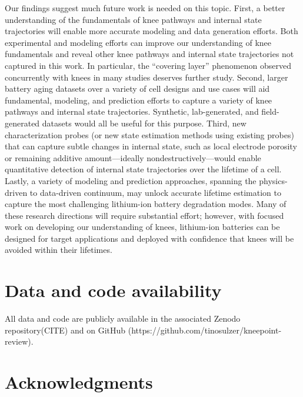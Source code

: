 \documentclass[journal=jpclcd,manuscript=article]{achemso}
\newcommand{\pbox}[1]{{
\fbox{
\parbox{0.8\textwidth}{  \fbox{$\triangleright$\textcolor{blue}{\textbf{Peter}:}} 
#1
}}}}
\begin{document}
Our findings suggest much future work is needed on this topic.
First, a better understanding of the fundamentals of knee pathways and internal state trajectories will enable more accurate modeling and data generation efforts. Both experimental and modeling efforts can improve our understanding of knee fundamentals and reveal other knee pathways and internal state trajectories not captured in this work.
In particular, the ``covering layer'' phenomenon observed concurrently with knees in many studies deserves further study.
Second, larger battery aging datasets over a variety of cell designs and use cases will aid fundamental, modeling, and prediction efforts to capture a variety of knee pathways and internal state trajectories. Synthetic, lab-generated, and field-generated datasets would all be useful for this purpose.
Third, new characterization probes (or new state estimation methods using existing probes) that can capture subtle changes in internal state, such as local electrode porosity or remaining additive amount---ideally nondestructively---would enable quantitative detection of internal state trajectories over the lifetime of a cell.
Lastly, a variety of modeling and prediction approaches, spanning the physics-driven to data-driven continuum, may unlock accurate lifetime estimation to capture the most challenging lithium-ion battery degradation modes.
Many of these research directions will require substantial effort; however, with focused work on developing our understanding of knees, lithium-ion batteries can be designed for target applications and deployed with confidence that knees will be avoided within their lifetimes. 


\section{Data and code availability}

All data and code are publicly available in the associated Zenodo repository(CITE) and on GitHub (https://github.com/tinosulzer/kneepoint-review).

\section{Acknowledgments}
\end{document}
